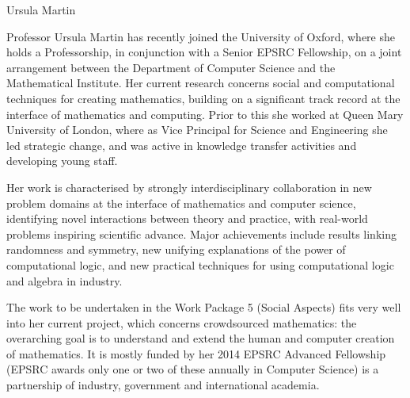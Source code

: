 \begin{participant}[type=PI,PM=2,gender=female]{Ursula Martin}

  Professor Ursula Martin has recently joined the University of Oxford, where she holds a
  Professorship, in conjunction with a Senior EPSRC Fellowship, on a joint arrangement
  between the Department of Computer Science and the Mathematical Institute. Her current
  research concerns social and computational techniques for creating mathematics, building
  on a significant track record at the interface of mathematics and computing. Prior to
  this she worked at Queen Mary University of London, where as Vice Principal for Science
  and Engineering she led strategic change, and was active in knowledge transfer
  activities and developing young staff.

Her work is characterised by strongly interdisciplinary collaboration in new
problem domains at the interface of mathematics and computer science,
identifying novel interactions between theory and practice, with real-world
problems inspiring scientific advance. Major achievements include results
linking randomness and symmetry, new unifying explanations of the power of
computational logic, and new practical techniques for using computational logic
and algebra in industry.

The work to be undertaken in the Work Package 5 (Social Aspects) fits very well
into her current project, which concerns crowdsourced mathematics: the overarching goal is
to understand and extend the human and computer creation of mathematics. 
It is mostly funded by her
2014 EPSRC Advanced Fellowship (EPSRC awards only one or two of these annually
in Computer Science) is a partnership of industry, government and international
academia.  
\end{participant}
